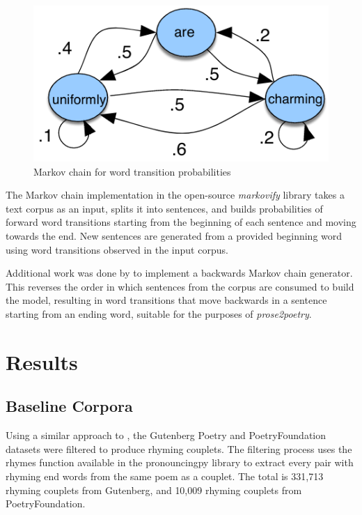 \documentclass[11pt,a4paper]{article}
\begin{document}
\begin{figure}
	\centering
	\includegraphics[scale=0.35]{./markov_chain.png}
	\caption{Markov chain for word transition probabilities \cite{jurafskymarkov}}
\label{fig:markov}
\end{figure}

The Markov chain implementation in the open-source \textit{markovify} \cite{markovify} library takes a text corpus as an input, splits it into sentences, and builds probabilities of forward word transitions starting from the beginning of each sentence and moving towards the end. New sentences are generated from a provided beginning word using word transitions observed in the input corpus.

Additional work was done by \citet{markovifyfork} to implement a backwards Markov chain generator. This reverses the order in which sentences from the corpus are consumed to build the model, resulting in word transitions that move backwards in a sentence starting from an ending word, suitable for the purposes of \textit{prose2poetry}.

\section{Results}
\label{sec:results}

\subsection{Baseline Corpora}
\label{sec:corpora}

Using a similar approach to \citet{cole}, the Gutenberg Poetry \cite{gutenbergpoetry} and PoetryFoundation \cite{poetryfoundationkaggle} datasets were filtered to produce rhyming couplets. The filtering process uses the rhymes function available in the pronouncingpy library to extract every pair with rhyming end words from the same poem as a couplet. The total is 331,713 rhyming couplets from Gutenberg, and 10,009 rhyming couplets from PoetryFoundation.
\end{document}
